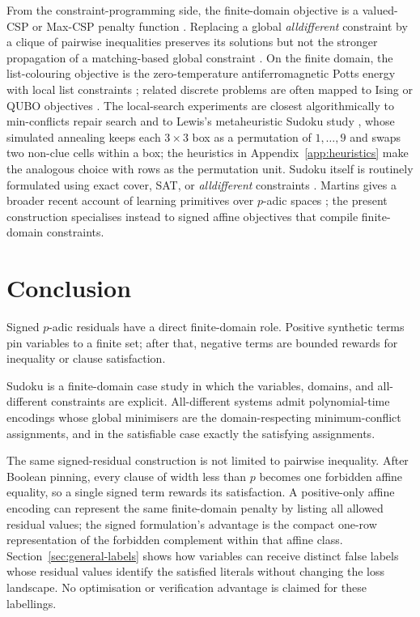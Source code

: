 \documentclass[11pt]{article}
\begin{document}
From the constraint-programming side, the finite-domain objective is a valued-CSP or Max-CSP penalty function \cite{schiex1995vcsp}. Replacing a global \emph{alldifferent} constraint by a clique of pairwise inequalities preserves its solutions but not the stronger propagation of a matching-based global constraint \cite{regin1994alldifferent}. On the finite domain, the list-colouring objective is the zero-temperature antiferromagnetic Potts energy with local list constraints \cite{ellismonaghan2014potts}; related discrete problems are often mapped to Ising or QUBO objectives \cite{lucas2014ising}. The local-search experiments are closest algorithmically to min-conflicts repair search \cite{minton1990minconflicts} and to Lewis's metaheuristic Sudoku study \cite{lewis2007metaheuristics}, whose simulated annealing keeps each \(3\times3\) box as a permutation of \(1,\dots,9\) and swaps two non-clue cells within a box; the heuristics in Appendix~\ref{app:heuristics} make the analogous choice with rows as the permutation unit. Sudoku itself is routinely formulated using exact cover, SAT, or \emph{alldifferent} constraints \cite{knuth2000dancing,simonis2005sudoku,lynce2006sudoku}. Martins gives a broader recent account of learning primitives over \(p\)-adic spaces \cite{martins2025learning}; the present construction specialises instead to signed affine objectives that compile finite-domain constraints.

\section{Conclusion}

Signed \(p\)-adic residuals have a direct finite-domain role. Positive synthetic terms pin variables to a finite set; after that, negative terms are bounded rewards for inequality or clause satisfaction.

Sudoku is a finite-domain case study in which the variables, domains, and all-different constraints are explicit. All-different systems admit polynomial-time encodings whose global minimisers are the domain-respecting minimum-conflict assignments, and in the satisfiable case exactly the satisfying assignments.

The same signed-residual construction is not limited to pairwise inequality. After Boolean pinning, every clause of width less than \(p\) becomes one forbidden affine equality, so a single signed term rewards its satisfaction. A positive-only affine encoding can represent the same finite-domain penalty by listing all allowed residual values; the signed formulation's advantage is the compact one-row representation of the forbidden complement within that affine class. Section~\ref{sec:general-labels} shows how variables can receive distinct false labels whose residual values identify the satisfied literals without changing the loss landscape. No optimisation or verification advantage is claimed for these labellings.
\end{document}
